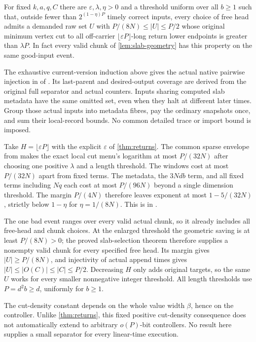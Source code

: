 \begin{theorem}\label{thm:off-carrier}
For fixed $k,a,q,C$ there are $\varepsilon,\lambda,\eta>0$ and a threshold
uniform over all $b\ge1$ such that, outside fewer than $2^{(1-\eta)P}$
timely correct inputs, every choice of free head admits a demanded raw set
$U$ with $P/(8N)\le|U|\le P/2$ whose original minimum vertex cut to all
off-carrier $\lfloor\varepsilon P\rfloor$-long return lower endpoints is
greater than $\lambda P$. In fact every valid chunk of
\cref{lem:slab-geometry} has this property on the same good-input event.
\end{theorem}
\begin{outline}
The exhaustive current-version induction above gives the actual native
pairwise injection in 
of . Its last-parent and desired-output
coverage are derived from the original full separator and actual counters.
Inputs sharing computed slab metadata have the same omitted set, even when
they halt at different later times. Group those actual inputs into metadata
fibres, pay the ordinary snapshots once, and sum their local-record bounds.
No common detailed trace or import bound is imposed.

Take $H=\lfloor\varepsilon P\rfloor$ with the explicit
$\varepsilon$ of \cref{thm:returns}. The common sparse envelope from
 makes the exact local cut menu's
logarithm at most $P/(32N)$ after choosing one positive $\lambda$ and a
length threshold. The windows cost at most $P/(32N)$ apart from fixed
terms. The metadata, the $3Ndb$ term, and all fixed terms including $Nq$
each cost at most $P/(96N)$ beyond a single dimension threshold.
The margin $P/(4N)$ therefore leaves exponent at most $1-5/(32N)$,
strictly below $1-\eta$ for $\eta=1/(8N)$.
This is  in .

The one bad event ranges over every valid actual chunk, so it already
includes all free-head and chunk choices. At the enlarged threshold the
geometric saving is at least $P/(8N)>0$; the proved slab-selection theorem
therefore supplies a nonempty valid chunk for every specified free head.
Its margin gives $|U|\ge P/(8N)$, and injectivity of actual append times
gives $|U|\le|O(C)|\le|C|\le P/2$. Decreasing $H$ only adds original targets,
so the same $U$ works for every smaller nonnegative integer threshold.
All length thresholds use $P=d^2b\ge d$, uniformly for $b\ge1$.
\end{outline}

The cut-density constant depends on the whole value width $\beta$, hence on
the controller. Unlike \cref{thm:returns}, this fixed positive cut-density
consequence does not automatically extend to arbitrary $o(P)$-bit controllers.
No result here supplies a small separator for every linear-time execution.
